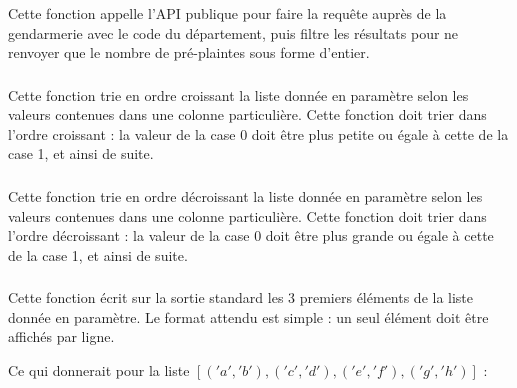 \noindent Cette fonction appelle l'API publique pour faire la requête auprès de la gendarmerie avec le code du département, puis filtre les résultats pour ne renvoyer que le nombre de pré-plaintes sous forme d'entier.




\subsubsection*{}

\noindent Cette fonction trie en ordre croissant la liste donnée en paramètre selon les valeurs contenues dans une colonne particulière.
Cette fonction doit trier dans l'ordre croissant : la valeur de la case 0 doit être plus petite ou égale à cette de la case 1, et ainsi de suite.


\subsubsection*{}

\noindent Cette fonction trie en ordre décroissant la liste donnée en paramètre selon les valeurs contenues dans une colonne particulière.
Cette fonction doit trier dans l'ordre décroissant : la valeur de la case 0 doit être plus grande ou égale à cette de la case 1, et ainsi de suite.




\subsubsection*{}

\noindent Cette fonction écrit sur la sortie standard les 3 premiers éléments de la liste donnée en paramètre.
Le format attendu est simple : un seul élément doit être affichés par ligne.

\bigskip

\noindent {}

\bigskip

\noindent Ce qui donnerait pour la liste $ [ ('a', 'b'), ('c', 'd'), ('e', 'f'), ('g', 'h') ] $ :


